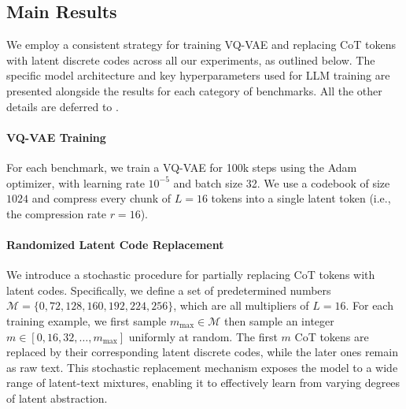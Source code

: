 \subsection{Main Results}
\label{sec:expr_main}
We employ a consistent strategy for training VQ-VAE and replacing CoT tokens with latent discrete codes across all our experiments, as outlined below.
The specific model architecture and key hyperparameters used for LLM training are presented alongside the results for each category of benchmarks.
All the other details are deferred to . 

\paragraph{VQ-VAE Training} For each benchmark, we train a VQ-VAE for 100k steps using the Adam optimizer, with learning rate $10^{-5}$ and batch size 32.
We use a codebook of size $1024$ and compress every chunk of $L=16$ tokens into a single latent token (i.e., the compression rate $r=16$).


\paragraph{Randomized Latent Code Replacement} We introduce a stochastic procedure for partially replacing CoT tokens with latent codes. 
Specifically, we define a set of predetermined numbers \( \mathcal{M} = \{0, 72, 128, 160, 192, 224, 256\}\), which are all multipliers of $L=16$.
For each training example, we first sample $m_{\max} \in \mathcal{M}$ then sample an integer $m \in [0, 16, 32, \ldots, m_{\max}]$ uniformly at random.
The first $m$ CoT tokens are replaced by their corresponding latent discrete codes, while the later ones remain as raw text. 
This stochastic replacement mechanism exposes the model to a wide range of latent-text mixtures, enabling it to effectively learn from varying degrees of latent abstraction.


